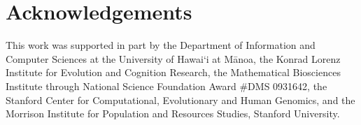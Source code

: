 \documentclass[9pt, a4paper, twocolumn]{extarticle}
\begin{document}
{\small
\section*{Acknowledgements}

This work was supported in part by 
the Department of Information and Computer Sciences at the University of Hawai`i at M{\=a}noa, 
the Konrad Lorenz Institute for Evolution and Cognition Research, 
the Mathematical Biosciences Institute through National Science Foundation Award \#DMS 0931642, 
the Stanford Center for Computational, Evolutionary and Human Genomics, 
and the Morrison Institute for Population and Resources Studies, Stanford University.
}


%

\end{document}
